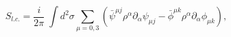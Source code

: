 \begin{equation}
S_{l.c.}=\frac{i}{2\pi}\;\int d^2\sigma \sum_{\mu =0,3}\left( \bar{\psi}^{\mu j}\rho^
{\alpha}\partial_{\alpha}\psi_{\mu j} - \bar{\phi}^{\mu k}\rho^
{\alpha}\partial_{\alpha}\phi_{\mu k}\right),\label{b}
\end{equation}

